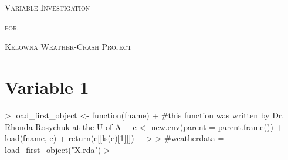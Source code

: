 \documentclass[11pt, a4paper]{article}
\begin{document}


\begin{center}
\Large{\textsc{Variable Investigation}}
\par
\normalsize{\textsc{for}}
\par
\large{\textsc{Kelowna Weather-Crash Project}}
\end{center}


\vspace{0.917 pc} %

\section*{Variable 1}




\begin{Schunk}
\begin{Sinput}
> load_first_object <- function(fname){
+   #this function was written by Dr. Rhonda Rosychuk at the U of A 
+   e <- new.env(parent = parent.frame())
+   load(fname, e)
+   return(e[[ls(e)[1]]])
+ }
> 
> #weatherdata = load_first_object("X.rda")
> 
\end{Sinput}
\end{Schunk}
\end{document}
